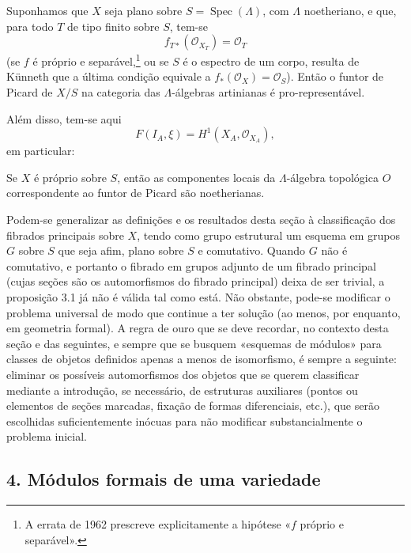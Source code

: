  Suponhamos que $X$ seja plano sobre
$S=\operatorname{Spec}(\Lambda)$, com $\Lambda$ noetheriano, e que, para todo
$T$ de tipo finito sobre $S$, tem-se
\[
  f_{T*}(\mathcal O_{X_T})=\mathcal O_T
\]
(se $f$ é próprio e separável,\footnote{A errata de 1962 prescreve
explicitamente a hipótese «$f$ próprio e separável».} ou se $S$ é o espectro
de um corpo, resulta de Künneth que a última condição equivale a
$f_*(\mathcal O_X)=\mathcal O_S$). Então o funtor de Picard de $X/S$ na
categoria das $\Lambda$-álgebras artinianas é pro-representável.

Além disso, tem-se aqui
\[
  F(I_A,\xi)=H^1(X_A,\mathcal O_{X_A}),
\]
em particular:

 Se $X$ é próprio sobre $S$, então as componentes
locais da $\Lambda$-álgebra topológica $O$ correspondente ao funtor de
Picard são noetherianas.

 Podem-se generalizar as definições e os resultados
desta seção à classificação dos fibrados principais sobre $X$, tendo como
grupo estrutural um esquema em grupos $G$ sobre $S$ que seja afim, plano sobre
$S$ e comutativo. Quando $G$ não é comutativo, e portanto o fibrado em
grupos adjunto de um fibrado principal (cujas seções são os automorfismos
do fibrado principal) deixa de ser trivial, a proposição 3.1 já não é válida
tal como está. Não obstante, pode-se modificar o problema universal de modo que
continue a ter solução (ao menos, por enquanto, em geometria formal). A regra de
ouro que se deve recordar, no contexto desta seção e das
seguintes, e sempre que se busquem «esquemas de módulos» para classes de
objetos definidos apenas a menos de isomorfismo, é sempre a seguinte: eliminar
os possíveis automorfismos dos objetos que se querem classificar mediante
a introdução, se necessário, de estruturas auxiliares (pontos ou
elementos de seções marcadas, fixação de formas diferenciais, etc.), que
serão escolhidas suficientemente inócuas para não modificar substancialmente o
problema inicial.

\subsection*{4. Módulos formais de uma variedade}

